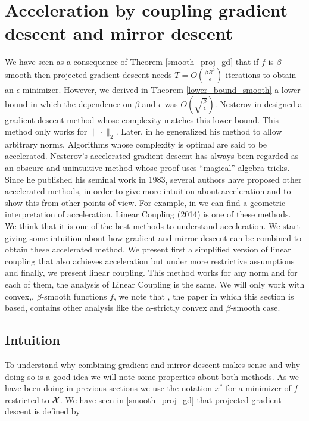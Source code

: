 
\section{Acceleration by coupling gradient descent and mirror descent}
We have seen as a consequence of Theorem \ref{smooth_proj_gd} that if $f$ is $\beta$-smooth then projected gradient descent needs $T = O\left( \frac{\beta R^2}{\epsilon}\right)$ iterations to obtain an $\epsilon$-minimizer. However, we derived in Theorem \ref{lower_bound_smooth} a lower bound in which the dependence on $\beta$ and $\epsilon$ was $O\left(\sqrt{\frac{\beta}{\epsilon}}\right)$. Nesterov in \cite{nesterov1983method} designed a gradient descent method whose complexity matches this lower bound. This method only works for $\|{\cdot}\|_2$. Later, in \cite{nesterov2005smooth} he generalized his method to allow arbitrary norms. Algorithms whose complexity is optimal are said to be accelerated. Nesterov's accelerated gradient descent has always been regarded as an obscure and unintuitive method whose proof uses ``magical'' algebra tricks. Since he published his seminal work in 1983, several authors have proposed other accelerated methods, in order to give more intuition about acceleration and to show this from other points of view. For example, in \cite{bubeck} we can find a geometric interpretation of acceleration. Linear Coupling \cite{linearcoupling} (2014) is one of these methods. We think that it is one of the best methods to understand acceleration. We start giving some intuition about how gradient and mirror descent can be combined to obtain these accelerated method. We present first a simplified version of linear coupling that also achieves acceleration but under more restrictive assumptions and finally, we present linear coupling. This method works for any norm and for each of them, the analysis of Linear Coupling is the same. We will only work with convex,, $\beta$-smooth functions $f$, we note that \cite{linearcoupling}, the paper in which this section is based, contains other analysis like the $\alpha$-strictly convex and $\beta$-smooth case.

\subsection{Intuition}

To understand why combining gradient and mirror descent makes sense and why doing so is a good idea we will note some properties about both methods. As we have been doing in previous sections we use the notation $x^\ast$ for a minimizer of $f$ restricted to $\mathcal{X}$. We have seen in \ref{smooth_proj_gd} that projected gradient descent is defined by

